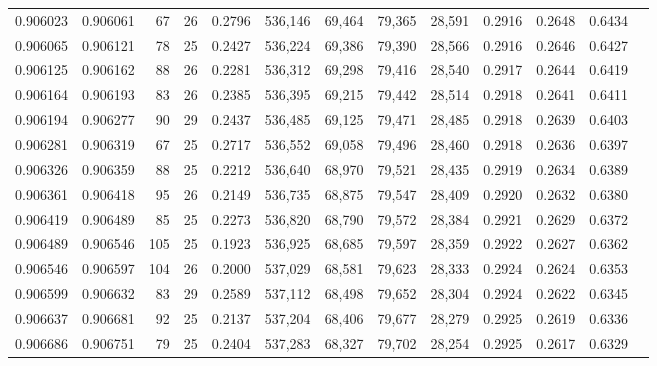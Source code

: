 \begin{tabular}{rrrrrrrrrrrrr}
0.906023 & 0.906061 &    67 &  26 &                                     0.2796 & 536,146 &  69,464 &  79,365 &  28,591 & 0.2916 & 0.2648 & 0.6434 \\
0.906065 & 0.906121 &    78 &  25 &                                     0.2427 & 536,224 &  69,386 &  79,390 &  28,566 & 0.2916 & 0.2646 & 0.6427 \\
0.906125 & 0.906162 &    88 &  26 &                                     0.2281 & 536,312 &  69,298 &  79,416 &  28,540 & 0.2917 & 0.2644 & 0.6419 \\
0.906164 & 0.906193 &    83 &  26 &                                     0.2385 & 536,395 &  69,215 &  79,442 &  28,514 & 0.2918 & 0.2641 & 0.6411 \\
0.906194 & 0.906277 &    90 &  29 &                                     0.2437 & 536,485 &  69,125 &  79,471 &  28,485 & 0.2918 & 0.2639 & 0.6403 \\
0.906281 & 0.906319 &    67 &  25 &                                     0.2717 & 536,552 &  69,058 &  79,496 &  28,460 & 0.2918 & 0.2636 & 0.6397 \\
0.906326 & 0.906359 &    88 &  25 &                                     0.2212 & 536,640 &  68,970 &  79,521 &  28,435 & 0.2919 & 0.2634 & 0.6389 \\
0.906361 & 0.906418 &    95 &  26 &                                     0.2149 & 536,735 &  68,875 &  79,547 &  28,409 & 0.2920 & 0.2632 & 0.6380 \\
0.906419 & 0.906489 &    85 &  25 &                                     0.2273 & 536,820 &  68,790 &  79,572 &  28,384 & 0.2921 & 0.2629 & 0.6372 \\
0.906489 & 0.906546 &   105 &  25 &                                     0.1923 & 536,925 &  68,685 &  79,597 &  28,359 & 0.2922 & 0.2627 & 0.6362 \\
0.906546 & 0.906597 &   104 &  26 &                                     0.2000 & 537,029 &  68,581 &  79,623 &  28,333 & 0.2924 & 0.2624 & 0.6353 \\
0.906599 & 0.906632 &    83 &  29 &                                     0.2589 & 537,112 &  68,498 &  79,652 &  28,304 & 0.2924 & 0.2622 & 0.6345 \\
0.906637 & 0.906681 &    92 &  25 &                                     0.2137 & 537,204 &  68,406 &  79,677 &  28,279 & 0.2925 & 0.2619 & 0.6336 \\
0.906686 & 0.906751 &    79 &  25 &                                     0.2404 & 537,283 &  68,327 &  79,702 &  28,254 & 0.2925 & 0.2617 & 0.6329 \\

\end{tabular}
